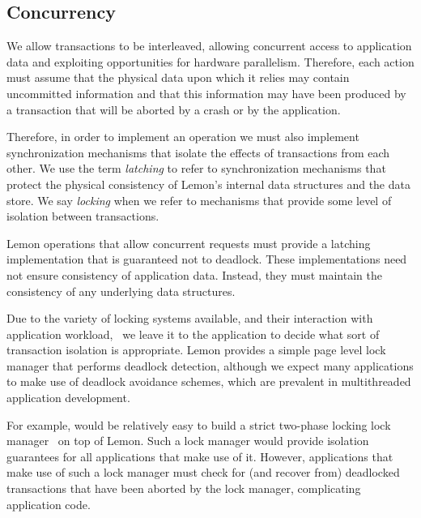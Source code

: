 \documentclass[letterpaper,twocolumn,english]{article}
\newcommand{\yad}{Lemon\xspace}
\begin{document}
\subsection{Concurrency}

We allow transactions to be interleaved, allowing concurrent access to
application data and exploiting opportunities for hardware
parallelism.  Therefore, each action must assume that the
physical data upon which it relies may contain uncommitted
information and that this information may have been produced by a
transaction that will be aborted by a crash or by the application.


Therefore, in order to implement an operation we must also implement
synchronization mechanisms that isolate the effects of transactions
from each other.  We use the term {\em latching} to refer to
synchronization mechanisms that protect the physical consistency of
\yad's internal data structures and the data store.  We say {\em
locking} when we refer to mechanisms that provide some level of
isolation between transactions.  

\yad operations that allow concurrent requests must provide a
latching implementation that is guaranteed not to deadlock.  These
implementations need not ensure consistency of application data.
Instead, they must maintain the consistency of any underlying data
structures.

Due to the variety of locking systems available, and their interaction
with application workload,~\cite{multipleGenericLocking} we leave it
to the application to decide what sort of transaction isolation is
appropriate.  \yad provides a simple page level lock manager that
performs deadlock detection, although we expect many applications to
make use of deadlock avoidance schemes, which are prevalent in
multithreaded application development.

For example, would be relatively easy to build a strict two-phase
locking lock
manager~\cite{hierarcicalLocking,hierarchicalLockingOnAriesExample} on
top of \yad.  Such a lock manager would provide isolation guarantees
for all applications that make use of it.  However, applications that
make use of such a lock manager must check for (and recover from)
deadlocked transactions that have been aborted by the lock manager,
complicating application code.
\end{document}
